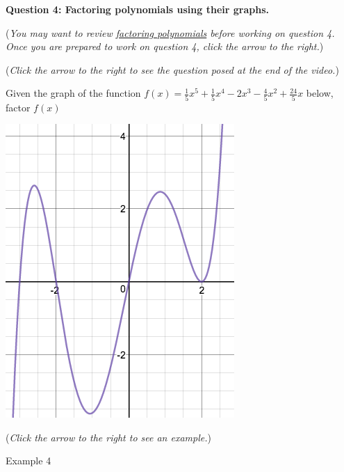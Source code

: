 \documentclass{ximera}
\begin{document}
\textbf{Question 4: Factoring polynomials using their graphs.}
\begin{question}
\begin{flushright}
{\color{blue}(\emph{You may want to review \href{https://ximera.osu.edu/math160fa17/m160prerequisites/PreRequisiteXards/U6MultiplyingAndFactoringPolynomials/6.2FactoringPolynomials/titlePage}{factoring polynomials} before working on question 4.  Once you are prepared to work on question 4, click the arrow to the right.})}
\end{flushright}
\begin{center}
\begin{expandable}
\begin{flushright}
{\color{blue}(\emph{Click the arrow to the right to see the question
posed at the end of the video.})}
\end{flushright}
\begin{expandable}
Given the graph of the function $f(x) = \frac{1}{5}x^5 + \frac{1}{5}x^4 - 2x^3 - \frac{4}{5}x^2 + \frac{24}{5}x$ below, factor $f(x)$
\begin{center}
\includegraphics[scale=0.4]{GraphFactor1.png}
\end{center}
\begin{multipleChoice}
\end{multipleChoice}
\begin{flushright}
{\color{blue}(\emph{Click the arrow to the right to see an example.})}
\end{flushright}
\begin{expandable}
Example 4
\end{expandable}
\end{expandable}
\end{expandable}
\end{center}
\end{question}
\end{document}
